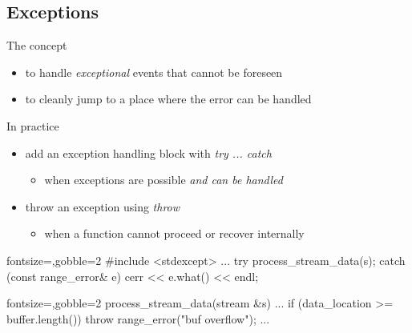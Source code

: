 \subsection[except]{Exceptions}

\begin{frame}[fragile]
  \begin{block}{The concept}
    \begin{itemize}
      \item to handle \textit{exceptional} events that cannot be foreseen
      \item to cleanly jump to a place where the error can be handled
    \end{itemize}
  \end{block}
  \begin{block}{In practice}
    \begin{itemize}
      \item add an exception handling block with {\it try ... catch}
      \begin{itemize}
        \item when exceptions are possible \textit{and can be handled}
      \end{itemize}
      \item throw an exception using {\it throw}
      \begin{itemize}
        \item when a function cannot proceed or recover internally
      \end{itemize}
    \end{itemize}
  \end{block}
  \begin{multicols}{2}
    \begin{cppcode*}{fontsize=\scriptsize,gobble=2}
      #include <stdexcept>
      ...
      try {
        process_stream_data(s);
      } catch (const range_error& e) {
        cerr << e.what() << endl;
      }
    \end{cppcode*}
    \columnbreak
    \begin{cppcode*}{fontsize=\scriptsize,gobble=2}
      process_stream_data(stream &s) {
        ...
        if (data_location >= buffer.length()) {
          throw range_error("buf overflow");
        }
        ...
      }
    \end{cppcode*}
  \end{multicols}
\end{frame}

